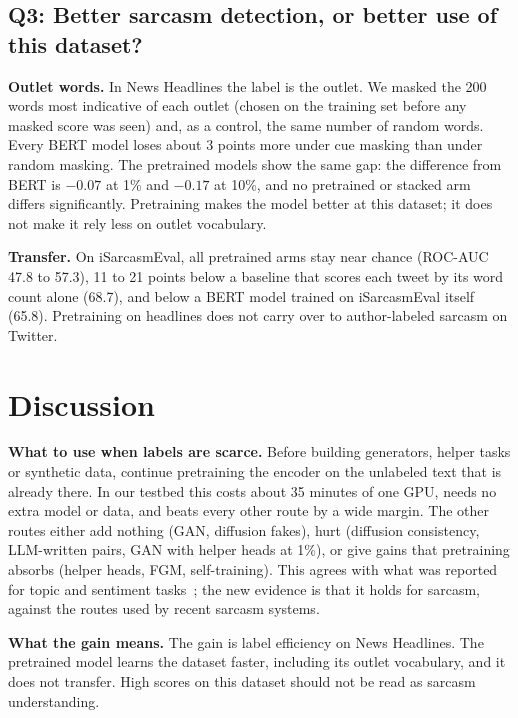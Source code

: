 \documentclass[conference]{IEEEtran}
\begin{document}
\subsection{Q3: Better sarcasm detection, or better use of this dataset?}
\textbf{Outlet words.} In News Headlines the label is the outlet. We masked the 200 words most indicative of each outlet (chosen on the training set before any masked score was seen) and, as a control, the same number of random words. Every BERT model loses about 3 points more under cue masking than under random masking. The pretrained models show the same gap: the difference from BERT is $-0.07$ at 1\% and $-0.17$ at 10\%, and no pretrained or stacked arm differs significantly. Pretraining makes the model better at this dataset; it does not make it rely less on outlet vocabulary.

\textbf{Transfer.} On iSarcasmEval, all pretrained arms stay near chance (ROC-AUC 47.8 to 57.3), 11 to 21 points below a baseline that scores each tweet by its word count alone (68.7), and below a BERT model trained on iSarcasmEval itself (65.8). Pretraining on headlines does not carry over to author-labeled sarcasm on Twitter.

\section{Discussion}

\textbf{What to use when labels are scarce.} Before building generators, helper tasks or synthetic data, continue pretraining the encoder on the unlabeled text that is already there. In our testbed this costs about 35 minutes of one GPU, needs no extra model or data, and beats every other route by a wide margin. The other routes either add nothing (GAN, diffusion fakes), hurt (diffusion consistency, LLM-written pairs, GAN with helper heads at 1\%), or give gains that pretraining absorbs (helper heads, FGM, self-training). This agrees with what was reported for topic and sentiment tasks~\cite{gururangan2020dont,shi2023rethinking}; the new evidence is that it holds for sarcasm, against the routes used by recent sarcasm systems.

\textbf{What the gain means.} The gain is label efficiency on News Headlines. The pretrained model learns the dataset faster, including its outlet vocabulary, and it does not transfer. High scores on this dataset should not be read as sarcasm understanding.
\end{document}
